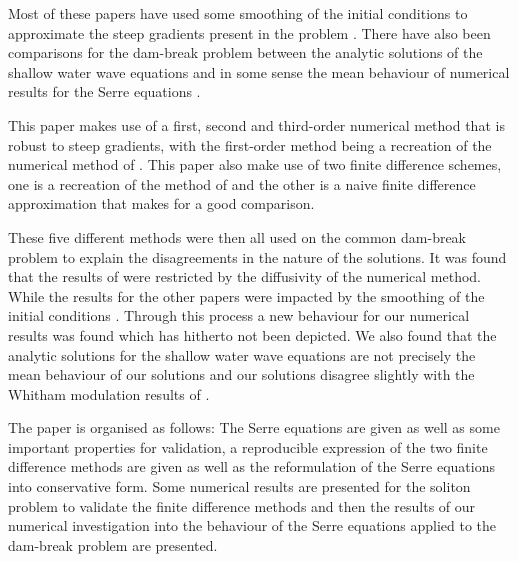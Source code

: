 \documentclass[SingleSpace,12pt,Journal]{Serre_ASCE}
\begin{document}
Most of these papers have used some smoothing of the initial conditions to approximate the steep gradients present in the problem \cite{El-etal-2006,Mitsotakis-etal-2014,Dutykh-2014-315}. There have also been comparisons for the dam-break problem between the analytic solutions of the shallow water wave equations and in some sense the mean behaviour of numerical results for the Serre equations \cite{Hank-etal-2010-2034,Dutykh-2014-315}.  

This paper makes use of a first, second and third-order numerical method \cite{Zoppou-etal-2017} that is robust to steep gradients, with the first-order method being a recreation of the numerical method of . This paper also make use of two finite difference schemes, one is a recreation of the method of  and the other is a naive finite difference approximation that makes for a good comparison.

These five different methods were then all used on the common dam-break problem \cite{El-etal-2006,Hank-etal-2010-2034} to explain the disagreements in the nature of the solutions. It was found that the results of  were restricted by the diffusivity of the numerical method. While the results for the other papers were impacted by the smoothing of the initial conditions \cite{El-etal-2006,Hank-etal-2010-2034}. Through this process a new behaviour for our numerical results was found which has hitherto not been depicted. We also found that the analytic solutions for the shallow water wave equations are not precisely the mean behaviour of our solutions and our solutions disagree slightly with the Whitham modulation results of .   

The paper is organised as follows: The Serre equations are given as well as some important properties for validation, a reproducible expression of the two finite difference methods are given as well as the reformulation of the Serre equations into conservative form. Some numerical results are presented for the soliton problem to validate the finite difference methods and then the results of our numerical investigation into the behaviour of the Serre equations applied to the dam-break problem are presented. 

\end{document}
